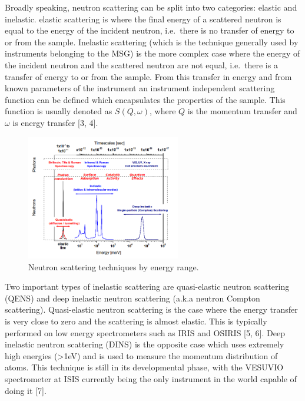\documentclass[paper=a4, fontsize=11pt]{scrartcl}	%
\numberwithin{equation}{section}															%
\numberwithin{figure}{section}																%
\numberwithin{table}{section}
\begin{document}
Broadly speaking, neutron scattering can be split into two categories:
elastic and inelastic. elastic scattering is where the final energy of a
scattered neutron is equal to the energy of the incident neutron,
i.e.~there is no transfer of energy to or from the sample. Inelastic
scattering (which is the technique generally used by instruments
belonging to the MSG) is the more complex case where the energy of the
incident neutron and the scattered neutron are not equal, i.e.~there is
a transfer of energy to or from the sample. From this transfer in energy
and from known parameters of the instrument an instrument independent
scattering function can be defined which encapsulates the properties of
the sample. This function is usually denoted as $S(Q,\omega)$, where $Q$
is the momentum transfer and $\omega$ is energy transfer {[}3, 4{]}.

\begin{figure}[H]
\centering
\includegraphics[width=0.6\textwidth]{img/instrument-energy-chart.png}
\caption{Neutron scattering techniques by energy range.}
\label{fig:instrument-energy-chart}
\end{figure}

Two important types of inelastic scattering are quasi-elastic neutron
scattering (QENS) and deep inelastic neutron scattering (a.k.a neutron
Compton scattering). Quasi-elastic neutron scattering is the case where
the energy transfer is very close to zero and the scattering is almost
elastic. This is typically performed on low energy spectrometers such as
IRIS and OSIRIS {[}5, 6{]}. Deep inelastic neutron scattering (DINS) is
the opposite case which uses extremely high energies (\textgreater{}1eV)
and is used to measure the momentum distribution of atoms. This
technique is still in its developmental phase, with the VESUVIO
spectrometer at ISIS currently being the only instrument in the world
capable of doing it {[}7{]}.
\end{document}
